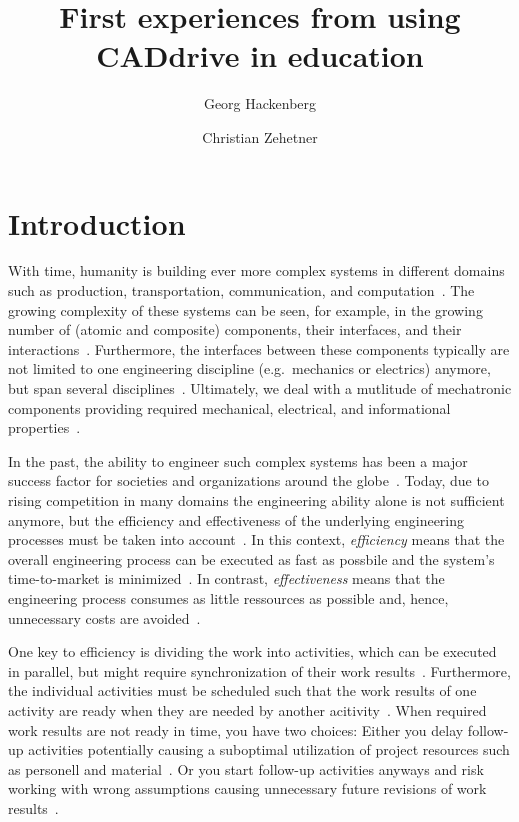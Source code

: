 \documentclass{PDS}
\begin{document}
\title{First experiences from using CADdrive in education}

\author{Georg Hackenberg}
\author{Christian Zehetner}

\address{School of Engineering, University of Applied Sciences Upper Austria, 4600 Wels, Austria}




\maketitle

\section{Introduction}
\label{sec:introduction}

With time, humanity is building ever more complex systems in different domains such as production, transportation, communication, and computation~\cite{TODO}.
The growing complexity of these systems can be seen, for example, in the growing number of (atomic and composite) components, their interfaces, and their interactions~\cite{TODO}.
Furthermore, the interfaces between these components typically are not limited to one engineering discipline (e.g.\ mechanics or electrics) anymore, but span several disciplines~\cite{TODO}.
Ultimately, we deal with a mutlitude of mechatronic components providing required mechanical, electrical, and informational properties~\cite{TODO}.

In the past, the ability to engineer such complex systems has been a major success factor for societies and organizations around the globe~\cite{TODO}.
Today, due to rising competition in many domains the engineering ability alone is not sufficient anymore, but the efficiency and effectiveness of the underlying engineering processes must be taken into account~\cite{TODO}.
In this context, \textit{efficiency} means that the overall engineering process can be executed as fast as possbile and the system's time-to-market is minimized~\cite{TODO}.
In contrast, \textit{effectiveness} means that the engineering process consumes as little ressources as possible and, hence, unnecessary costs are avoided~\cite{TODO}.

One key to efficiency is dividing the work into activities, which can be executed in parallel, but might require synchronization of their work results~\cite{TODO}.
Furthermore, the individual activities must be scheduled such that the work results of one activity are ready when they are needed by another acitivity~\cite{TODO}.
When required work results are not ready in time, you have two choices:
Either you delay follow-up activities potentially causing a suboptimal utilization of project resources such as personell and material~\cite{TODO}.
Or you start follow-up activities anyways and risk working with wrong assumptions causing unnecessary future revisions of work results~\cite{TODO}.
\end{document}
